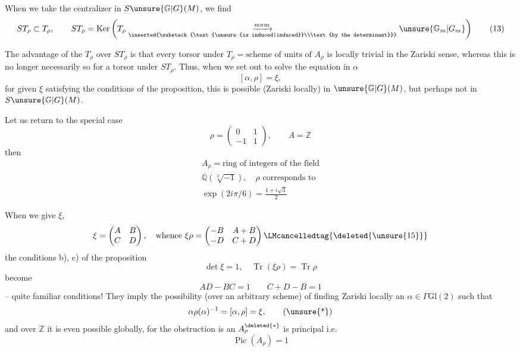 When we take the centralizer in
$S\unsure{\mathbb G|G}(M)$, we find
\[
ST_\rho\subset T_\rho,\qquad
ST_\rho=\operatorname{Ker}\left(
T_\rho
\underset{\inserted{\substack{\text{\unsure{is induced|induced}}\\\text{by the determinant}}}}
{\xrightarrow{\text{norm}}}\unsure{\mathbb G_m|G_m}\right)
\tag{13}
\]

The advantage of the $T_\rho$ over $ST_\rho$ is that
every torsor under $T_\rho=\text{scheme of units of }A_\rho$
is locally trivial in the Zariski sense, whereas
this is no longer necessarily so for
a torsor under $ST_\rho$. Thus, when
we set out to solve the equation in $\alpha$
\[
[\alpha,\rho]=\xi,
\]
for given $\xi$ satisfying the conditions of the
proposition, this is possible (Zariski locally) in
$\unsure{\mathbb G|G}(M)$, but perhaps not in $S\unsure{\mathbb G|G}(M)$.



Let us return to the special case
\[
\rho=\begin{pmatrix}0&1\\-1&1\end{pmatrix},\qquad A=\mathbb Z
\]
then
\[
\begin{gathered}
A_\rho=\text{ring of integers of the field}\\
\mathbb Q(\sqrt[3]{-1}),\quad \rho\text{ corresponds to}\\
\exp(2i\pi/6)=\frac{1+i\sqrt3}{2}
\end{gathered}
\tag{14}
\]

When we give  $\xi$, 
\[
\xi=\begin{pmatrix}A&B\\C&D\end{pmatrix},\quad
\text{whence }\xi\rho=
\begin{pmatrix}-B&A+B\\-D&C+D\end{pmatrix}
\LMcancelledtag{\deleted{\unsure{15}}}
\]
the conditions  b), c) of the proposition
\[
\det\xi=1,\quad \operatorname{Tr}(\xi\rho)=\operatorname{Tr}\rho
\]
 become
\[
AD-BC=1\qquad C+D-B=1
\tag{16}
\]
-- quite familiar conditions! They imply
the possibility  (over an arbitrary scheme)
of finding Zariski locally an $\alpha\in\Gamma\mathrm{Gl}(2)$
such that 
\[
\alpha\rho(\alpha)^{-1}=[\alpha,\rho]=\xi,
\tag{\unsure{*}}
\]
and over $\mathbb Z$ it is even possible globally,
for the obstruction is an 
$A_\rho^{\deleted{*}}$ is principal  i.e. 
\[
\operatorname{Pic}(A_\rho)=1
\tag{17}
\]

